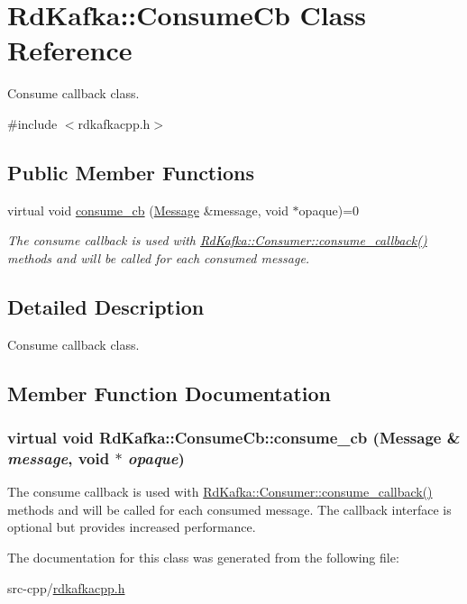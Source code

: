 \hypertarget{classRdKafka_1_1ConsumeCb}{
\section{RdKafka::ConsumeCb Class Reference}
\label{classRdKafka_1_1ConsumeCb}
}


Consume callback class.  


{\ttfamily \#include $<$rdkafkacpp.h$>$}\subsection*{Public Member Functions}
\begin{DoxyCompactItemize}
\item 
virtual void \hyperlink{classRdKafka_1_1ConsumeCb_ae17e0e46606ef3ae1bbfedfff843d08c}{consume\_\-cb} (\hyperlink{classRdKafka_1_1Message}{Message} \&message, void $\ast$opaque)=0
\begin{DoxyCompactList}\small\item\em The consume callback is used with \hyperlink{classRdKafka_1_1Consumer_a15a3e64a1ed777804df8b4ea02a40887}{RdKafka::Consumer::consume\_\-callback()} methods and will be called for each consumed {\ttfamily message}. \item\end{DoxyCompactList}\end{DoxyCompactItemize}


\subsection{Detailed Description}
Consume callback class. 

\subsection{Member Function Documentation}
\hypertarget{classRdKafka_1_1ConsumeCb_ae17e0e46606ef3ae1bbfedfff843d08c}{
\subsubsection[{consume\_\-cb}]{\setlength{\rightskip}{0pt plus 5cm}virtual void RdKafka::ConsumeCb::consume\_\-cb ({\bf Message} \& {\em message}, \/  void $\ast$ {\em opaque})}}
\label{classRdKafka_1_1ConsumeCb_ae17e0e46606ef3ae1bbfedfff843d08c}


The consume callback is used with \hyperlink{classRdKafka_1_1Consumer_a15a3e64a1ed777804df8b4ea02a40887}{RdKafka::Consumer::consume\_\-callback()} methods and will be called for each consumed {\ttfamily message}. The callback interface is optional but provides increased performance. 

The documentation for this class was generated from the following file:\begin{DoxyCompactItemize}
\item 
src-\/cpp/\hyperlink{rdkafkacpp_8h}{rdkafkacpp.h}\end{DoxyCompactItemize}
